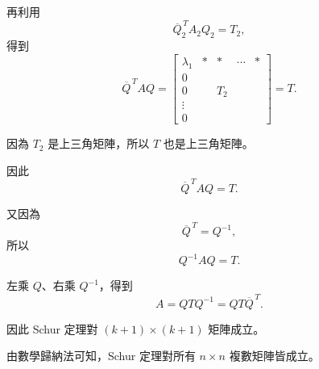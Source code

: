 \documentclass[12pt,a4paper]{article}
\begin{document}
再利用
\[
    \overline{Q}_2^{\,T}A_2Q_2=T_2,
\]
得到
\[
    \boxed{
        \overline{Q}^{\,T}AQ
        =
        \left[
            \begin{array}{ccccc}
                \lambda_1 & * & *   & \cdots & * \\
                0         &   &     &        &   \\
                0         &   & T_2 &        &   \\
                \vdots    &   &     &        &   \\
                0         &   &     &        &
            \end{array}
            \right]
        =T.
    }
\]

因為 $T_2$ 是上三角矩陣，所以 $T$ 也是上三角矩陣。

因此
\[
    \overline{Q}^{\,T}AQ=T.
\]

又因為
\[
    \overline{Q}^{\,T}=Q^{-1},
\]
所以
\[
    Q^{-1}AQ=T.
\]

左乘 $Q$、右乘 $Q^{-1}$，得到
\[
    \boxed{
        A=QTQ^{-1}=QT\overline{Q}^{\,T}.
    }
\]

因此 Schur 定理對 $(k+1)\times(k+1)$ 矩陣成立。

由數學歸納法可知，Schur 定理對所有 $n\times n$ 複數矩陣皆成立。
\end{document}
